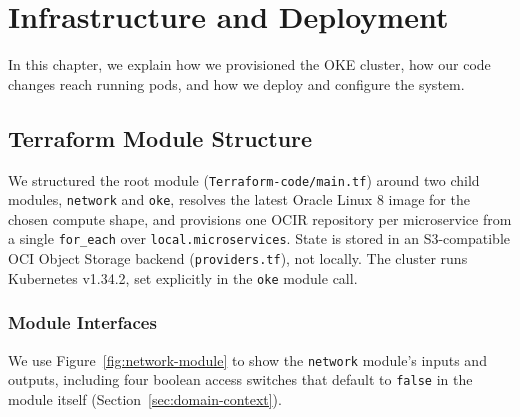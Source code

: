 \chapter{Infrastructure and Deployment}\label{chap:Methodology}

In this chapter, we explain how we provisioned the OKE cluster, how our code
changes reach running pods, and how we deploy and configure the system.

\section{Terraform Module Structure}\label{sec:manual-console-build}
We structured the root module (\texttt{Terraform-\allowbreak code/\allowbreak main.tf}) around two child modules,
\texttt{network} and \texttt{oke}, resolves the latest Oracle Linux 8 image for the
chosen compute shape, and provisions one OCIR repository per microservice from a
single \texttt{for\_each} over \texttt{local.microservices}. State is stored in an
S3-compatible OCI Object Storage backend (\texttt{providers.tf}), not locally. The
cluster runs Kubernetes v1.34.2, set explicitly in the \texttt{oke} module call.

\subsection*{Module Interfaces}
We use Figure~\ref{fig:network-module} to show the \texttt{network} module's inputs and
outputs, including four boolean access switches that default to \texttt{false} in
the module itself (Section~\ref{sec:domain-context}).

